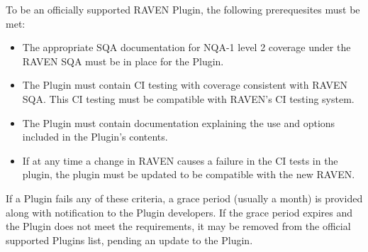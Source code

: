  To be an officially supported RAVEN Plugin, the following prerequesites must be met:
 \begin{itemize}
  \item The appropriate SQA documentation for NQA-1 level 2 coverage under the RAVEN SQA must be in place for the Plugin.
  \item The Plugin must contain CI testing with coverage consistent with RAVEN SQA. This CI testing must be compatible with RAVEN's CI testing system.
  \item The Plugin must contain documentation explaining the use and options included in the Plugin's contents.
  \item If at any time a change in RAVEN causes a failure in the CI tests in the plugin, the plugin must be updated to be compatible with the new RAVEN.
 \end{itemize}

 If a Plugin fails any of these criteria, a grace period (usually a month) is provided along with
 notification to the Plugin developers. If the grace period expires and the Plugin does not meet the
 requirements, it may be removed from the official supported Plugins list, pending an update to the
 Plugin.

